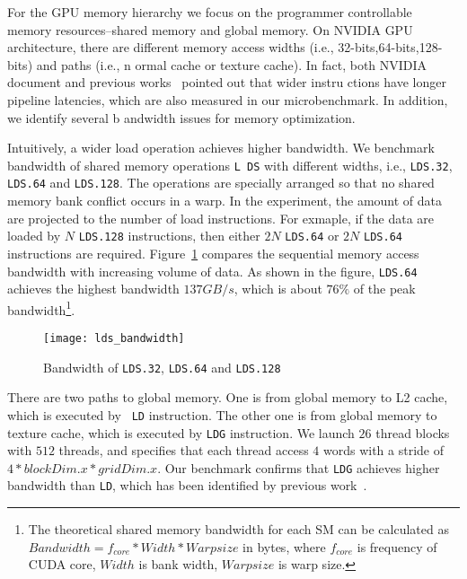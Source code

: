 For the GPU memory hierarchy we focus on the programmer controllable memory resources--shared memory and global memory. 
On NVIDIA GPU architecture, there are different memory access widths (i.e., 32-bits,64-bits,128-bits) and paths (i.e., n
ormal cache or texture cache). In fact, both NVIDIA document and previous works~\cite{tan} pointed out that wider instru
ctions have longer pipeline latencies, which are also measured in our microbenchmark. In addition, we identify several b
andwidth issues for memory optimization.

Intuitively, a wider load operation achieves higher bandwidth. We benchmark bandwidth of shared memory operations {\tt L
DS} with different widths, i.e., {\tt LDS.32}, {\tt LDS.64}
and {\tt LDS.128}. The operations are specially arranged so that no shared memory bank conflict occurs in a warp. In the
experiment, the amount of data are projected to the number of load instructions. For exmaple, if the data are loaded by
$N$ {\tt LDS.128} instructions, then either $2N$ {\tt LDS.64} or $2N$ {\tt LDS.64} instructions are required.
Figure~\ref{fig:lds_bw} compares the sequential memory access bandwidth with increasing volume of data. As shown in the 
figure, {\tt LDS.64} achieves the highest bandwidth $137GB/s$, which is about $76\%$ of the peak bandwidth\footnote{The 
theoretical shared memory bandwidth for each SM can be calculated as $Bandwidth=f_{core}*Width*Warpsize$ in
bytes, where $f_{core}$ is frequency of CUDA core, $Width$ is bank width, $Warpsize$ is warp size.}.

\begin{figure}[htbp]
\begin{center}
\texttt{[image: lds\_bandwidth]}
    \caption{ Bandwidth of {\tt LDS.32}, {\tt LDS.64} and {\tt LDS.128}}
\label{fig:lds_bw}
\end{center}
\end{figure}

There are two paths to global memory. One is from global memory to L2 cache, which is executed by {\tt
LD} instruction. The other one is from global memory to texture cache, which is executed by {\tt LDG} instruction. We
launch $26$ thread blocks with $512$ threads, and specifies that each thread access $4$ words with a stride of
$4*blockDim.x*gridDim.x$. Our benchmark confirms that {\tt LDG} achieves higher bandwidth than {\tt LD}, which has been
identified by previous work~\cite{tan}.
